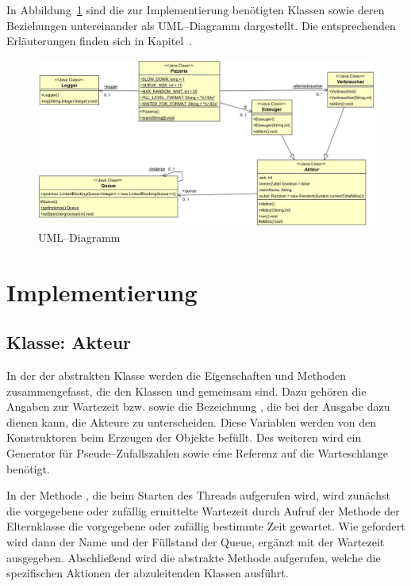 In Abbildung~\ref{fig:epk} sind die zur Implementierung benötigten Klassen sowie deren Beziehungen untereinander als UML–Diagramm dargestellt. Die entsprechenden Erläuterungen finden sich in Kapitel~.

\label{sub:uml_diagramm}
\begin{figure}[H]
\begin{center}
\includegraphics[width=\textwidth]{UML.jpg}
\caption{UML–Diagramm}
\label{fig:epk}
\end{center}
\end{figure}


\section{Implementierung} %
\label{sec:implementierung}

\subsection{Klasse: Akteur} %
\label{sub:klasse_akteur}
In der der abstrakten Klasse  werden die Eigenschaften und Methoden zusammengefasst, die den Klassen  und  gemeinsam sind. Dazu gehören die Angaben zur Wartezeit  bzw.  sowie die Bezeichnung , die bei der Ausgabe dazu dienen kann, die Akteure zu unterscheiden. Diese Variablen werden von den Konstruktoren beim Erzeugen der Objekte befüllt. Des weiteren wird ein Generator für Pseude–Zufallszahlen sowie eine Referenz auf die Warteschlange benötigt.

In der Methode , die beim Starten des Threads aufgerufen wird, wird zunächst die vorgegebene oder zufällig ermittelte Wartezeit durch Aufruf der Methode  der Elternklasse  die vorgegebene oder zufällig bestimmte Zeit gewartet. Wie gefordert wird dann der Name und der Füllstand der Queue, ergänzt mit der Wartezeit ausgegeben. Abschließend wird die abstrakte Methode  aufgerufen, welche die spezifischen Aktionen der abzuleitenden Klassen ausführt.

